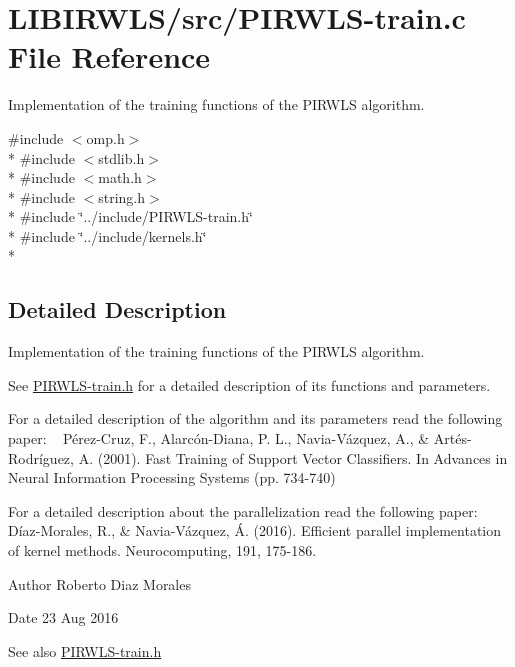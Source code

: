 \hypertarget{PIRWLS-train_8c}{}\section{L\+I\+B\+I\+R\+W\+L\+S/src/\+P\+I\+R\+W\+L\+S-\/train.c File Reference}
\label{PIRWLS-train_8c}


Implementation of the training functions of the P\+I\+R\+W\+LS algorithm.  


{\ttfamily \#include $<$omp.\+h$>$}\\*
{\ttfamily \#include $<$stdlib.\+h$>$}\\*
{\ttfamily \#include $<$math.\+h$>$}\\*
{\ttfamily \#include $<$string.\+h$>$}\\*
{\ttfamily \#include \char`\"{}../include/\+P\+I\+R\+W\+L\+S-\/train.\+h\char`\"{}}\\*
{\ttfamily \#include \char`\"{}../include/kernels.\+h\char`\"{}}\\*


\subsection{Detailed Description}
Implementation of the training functions of the P\+I\+R\+W\+LS algorithm. 

See \hyperlink{PIRWLS-train_8h}{P\+I\+R\+W\+L\+S-\/train.\+h} for a detailed description of its functions and parameters.

For a detailed description of the algorithm and its parameters read the following paper\+: ~\newline
 Pérez-\/\+Cruz, F., Alarcón-\/\+Diana, P. L., Navia-\/\+Vázquez, A., \& Artés-\/\+Rodríguez, A. (2001). Fast Training of Support Vector Classifiers. In Advances in Neural Information Processing Systems (pp. 734-\/740)

For a detailed description about the parallelization read the following paper\+: ~\newline
Díaz-\/\+Morales, R., \& Navia-\/\+Vázquez, Á. (2016). Efficient parallel implementation of kernel methods. Neurocomputing, 191, 175-\/186.

\begin{DoxyAuthor}{Author}
Roberto Diaz Morales 
\end{DoxyAuthor}
\begin{DoxyDate}{Date}
23 Aug 2016 
\end{DoxyDate}
\begin{DoxySeeAlso}{See also}
\hyperlink{PIRWLS-train_8h}{P\+I\+R\+W\+L\+S-\/train.\+h} 
\end{DoxySeeAlso}
